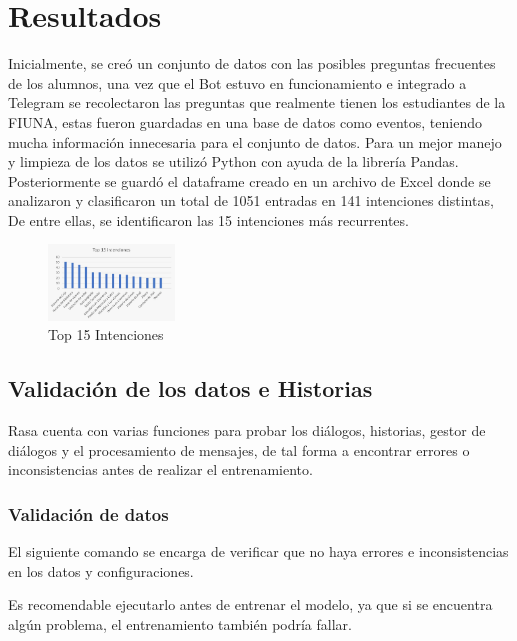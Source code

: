\section{Resultados}
Inicialmente, se creó un conjunto de datos con las posibles preguntas frecuentes de los alumnos,
una vez que el Bot estuvo en funcionamiento e integrado a Telegram se recolectaron las preguntas
que realmente tienen los estudiantes de la FIUNA, estas fueron guardadas en una base de datos como
eventos, teniendo mucha información innecesaria para el conjunto de datos. Para un mejor manejo y
limpieza de los datos se utilizó Python con ayuda de la librería Pandas. Posteriormente se guardó
el dataframe creado en un archivo de Excel donde se analizaron y clasificaron un total de 1051
entradas en 141 intenciones distintas, De entre ellas, se identificaron las 15 intenciones más
recurrentes.

\begin{figure}[H]
	\centering
	\includegraphics[angle=0,width=0.3\textwidth]{Figuras/Top15intents.jpeg}
	\caption{Top 15 Intenciones}
	\label{fig:Top15intents}
\end{figure}

\subsection{Validación de los datos e Historias}
Rasa cuenta con varias funciones para probar los diálogos, historias, gestor de diálogos y el
procesamiento de mensajes, de tal forma a encontrar errores o inconsistencias antes de realizar el
entrenamiento.

\subsubsection{Validación de datos}
El siguiente comando se encarga de verificar que no haya errores e inconsistencias en los datos y
configuraciones.

\begin{center}
\end{center}

Es recomendable ejecutarlo antes de entrenar el modelo, ya que si se encuentra algún problema, el
entrenamiento también podría fallar.

